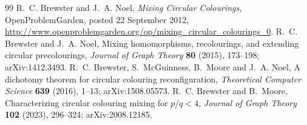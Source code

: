 \documentclass[11pt,a4paper]{article}
\theoremstyle{plain}
\theoremstyle{definition}
\theoremstyle{remark}
\begin{document}


\begin{thebibliography}{99}
\small
\setlength{\itemsep}{2pt}
 R.~C. Brewster and J.~A. Noel, \emph{Mixing Circular Colourings}, OpenProblemGarden, posted 22 September 2012, \url{http://www.openproblemgarden.org/op/mixing_circular_colourings_0}.
 R.~C. Brewster and J.~A. Noel, Mixing homomorphisms, recolourings, and extending circular precolourings, \emph{Journal of Graph Theory} \textbf{80} (2015), 173--198; arXiv:1412.3493.
 R.~C. Brewster, S.~McGuinness, B.~Moore and J.~A. Noel, A dichotomy theorem for circular colouring reconfiguration, \emph{Theoretical Computer Science} \textbf{639} (2016), 1--13; arXiv:1508.05573.
 R.~C. Brewster and B.~Moore, Characterizing circular colouring mixing for $p/q<4$, \emph{Journal of Graph Theory} \textbf{102} (2023), 296--324; arXiv:2008.12185.
\end{thebibliography}
\end{document}
